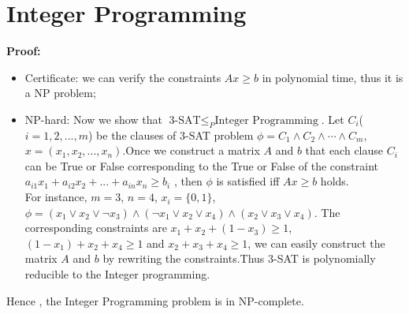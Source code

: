 \section{Integer Programming}

\textbf{Proof:} \\
\begin{itemize}
	\item Certificate: we can verify the constraints $Ax \geq b $ in polynomial time, thus it is a NP problem;
	\item NP-hard: Now we show that $\text{3-SAT} \leq_{P} \text{Integer Programming}$.
	Let $C_i$($i=1,2,...,m$) be the clauses of 3-SAT problem $\phi = C_1 \wedge C_2 \wedge \cdots \wedge C_m$, $x = (x_1,x_2,...,x_n)$.Once we construct a matrix $A$ and $b$ that each clause $C_i$ can be True or False corresponding to the True or False of the constraint $ a_{i1}x_1 + a_{i2}x_2 + ... + a_{in}x_n \geq b_i$
	, then $\phi$ is satisfied iff $Ax \geq b$ holds. \\
	For instance, $m=3$, $n =4$, $x_i = \{0,1\}$, $\phi =  (x_1 \vee x_2 \vee \neg x_3) \wedge (\neg x_1 \vee x_2 \vee x_4   ) \wedge (x_2 \vee x_3 \vee   x_4)$.  The corresponding constraints are $x_1 + x_2 + (1-x_3) \geq 1$,	$(1-x_1) + x_2 + x_4 \geq 1$ and 
	$ x_2 + x_3 + x_4 \geq 1$,
	we can easily construct the matrix $A$ and $b$ by rewriting the constraints.Thus $3$-SAT is polynomially reducible to the Integer programming. 
\end{itemize}
Hence , the Integer Programming problem is in NP-complete.